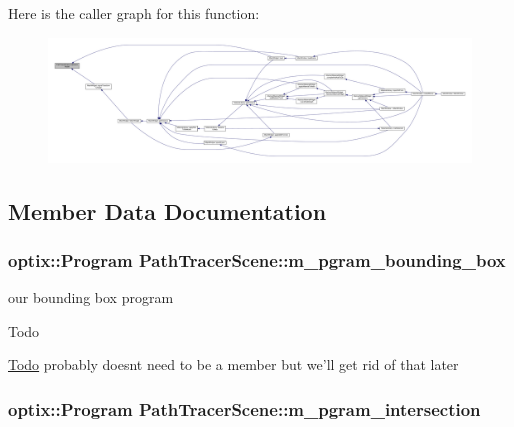 Here is the caller graph for this function\-:
\nopagebreak
\begin{figure}[H]
\begin{center}
\leavevmode
\includegraphics[width=350pt]{class_path_tracer_scene_adeddc6d4c2df9c23baebb32ee016c57b_icgraph}
\end{center}
\end{figure}




\subsection{Member Data Documentation}
\hypertarget{class_path_tracer_scene_a9eff6b99097c6edb6e4da1ab6da1f494}{
\subsubsection[{m\-\_\-pgram\-\_\-bounding\-\_\-box}]{\setlength{\rightskip}{0pt plus 5cm}optix\-::\-Program Path\-Tracer\-Scene\-::m\-\_\-pgram\-\_\-bounding\-\_\-box\hspace{0.3cm}{\ttfamily [private]}}}\label{class_path_tracer_scene_a9eff6b99097c6edb6e4da1ab6da1f494}


our bounding box program 

\begin{DoxyRefDesc}{Todo}
\item[\hyperlink{todo__todo000005}{Todo}]probably doesnt need to be a member but we'll get rid of that later \end{DoxyRefDesc}
\hypertarget{class_path_tracer_scene_a50f096b5a5941c50a87fdd8864304852}{
\subsubsection[{m\-\_\-pgram\-\_\-intersection}]{\setlength{\rightskip}{0pt plus 5cm}optix\-::\-Program Path\-Tracer\-Scene\-::m\-\_\-pgram\-\_\-intersection\hspace{0.3cm}{\ttfamily [private]}}}\label{class_path_tracer_scene_a50f096b5a5941c50a87fdd8864304852}


